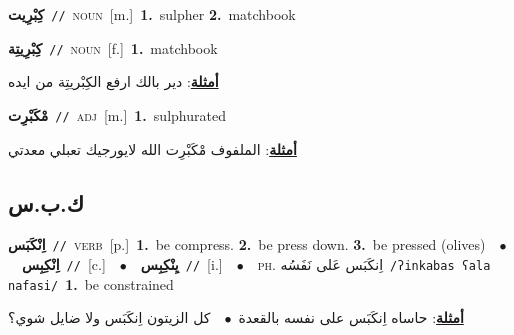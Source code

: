 \documentclass[10pt,a4paper,twoside]{article} %
\begin{document}
\begin{multicols}{2}
{\setlength\topsep{0pt}\textbf{\foreignlanguage{arabic}{كِبْرِيت}}\ {\color{gray}\texttt{//}\color{black}}\ \textsc{noun}\ [m.]\ \textbf{1.}~sulpher  \textbf{2.}~matchbook\ } \vspace{2mm}

{\setlength\topsep{0pt}\textbf{\foreignlanguage{arabic}{كِبْرِيتِة}}\ {\color{gray}\texttt{//}\color{black}}\ \textsc{noun}\ [f.]\ \textbf{1.}~matchbook\  \begin{flushright}\color{gray}\foreignlanguage{arabic}{\textbf{\underline{\foreignlanguage{arabic}{أمثلة}}}: دير بالك ارفع الكِبْريتِة من ايده}\end{flushright}\color{black}} \vspace{2mm}

{\setlength\topsep{0pt}\textbf{\foreignlanguage{arabic}{مْكَبْرِت}}\ {\color{gray}\texttt{//}\color{black}}\ \textsc{adj}\ [m.]\ \textbf{1.}~sulphurated\  \begin{flushright}\color{gray}\foreignlanguage{arabic}{\textbf{\underline{\foreignlanguage{arabic}{أمثلة}}}: الملفوف مْكَبْرِت الله لايورجيك تعبلي معدتي}\end{flushright}\color{black}} \vspace{2mm}

\vspace{-3mm}
\subsection*{\color{blue}\foreignlanguage{arabic}{ك.ب.س}\color{blue}{}} 

{\setlength\topsep{0pt}\textbf{\foreignlanguage{arabic}{اِنْكَبَس}}\ {\color{gray}\texttt{//}\color{black}}\ \textsc{verb}\ [p.]\ \textbf{1.}~be compress.  \textbf{2.}~be press down.  \textbf{3.}~be pressed (olives)\ \ $\bullet$\ \ \setlength\topsep{0pt}\textbf{\foreignlanguage{arabic}{اِنْكِبِس}}\ {\color{gray}\texttt{//}\color{black}}\ [c.]\ \ $\bullet$\ \ \setlength\topsep{0pt}\textbf{\foreignlanguage{arabic}{يِنْكِبِس}}\ {\color{gray}\texttt{//}\color{black}}\ [i.]\ \ $\bullet$\ \ \textsc{ph.} \color{gray} \foreignlanguage{arabic}{اِنكَبَس عَلى نَفَسُه}\color{black}\ {\color{gray}\texttt{/{\sffamily ʔinkabas ʕala nafasi}/}\color{black}}\ \textbf{1.}~be constrained\  \begin{flushright}\color{gray}\foreignlanguage{arabic}{\textbf{\underline{\foreignlanguage{arabic}{أمثلة}}}: حاساه اِنكَبَس على نفسه بالقعدة\ $\bullet$\ \  كل الزيتون اِنكَبَس ولا ضايل شوي؟}\end{flushright}\color{black}} \vspace{2mm}


\end{multicols}
\end{document}
